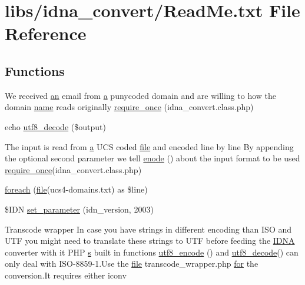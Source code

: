 \hypertarget{ReadMe_8txt}{}\section{libs/idna\+\_\+convert/\+Read\+Me.txt File Reference}
\label{ReadMe_8txt}
\subsection*{Functions}
\begin{DoxyCompactItemize}
\item 
We received \hyperlink{jquery-1_8x_8min_8js_ada4b4d9ce9b76d68aeaf886e5325561f}{an} email from \hyperlink{jqplot_8barRenderer_8min_8js_a15f14caa0c9de3a415d8eb9d88378fc0}{a} punycoded domain and are willing to how the domain \hyperlink{common_8js_a22c29d2aa8ed6161ce8faa718ef76e68}{name} reads originally \hyperlink{ReadMe_8txt_a0edf7f7cb39cbd14fd21a81cd78538f2}{require\+\_\+once} (\textquotesingle{}idna\+\_\+convert.\+class.\+php\textquotesingle{})
\item 
echo \hyperlink{ReadMe_8txt_ac2e4651b745884c7e260ebbc00410561}{utf8\+\_\+decode} (\$output)
\item 
The input is read from \hyperlink{jqplot_8barRenderer_8min_8js_a15f14caa0c9de3a415d8eb9d88378fc0}{a} U\+CS coded \hyperlink{classfile}{file} and encoded line by line By appending the optional second parameter we tell \hyperlink{ReadMe_8txt_a6d3546de17713c76ce7644b01169b126}{enode} () about the input format to be used \hyperlink{ReadMe_8txt_a81b31ad37fad0079bd14d86a4889ffa0}{require\+\_\+once}(\textquotesingle{}idna\+\_\+convert.\+class.\+php\textquotesingle{})
\item 
\hyperlink{ReadMe_8txt_a78ed9bdcd90fd96af66d03ef8b32649c}{foreach} (\hyperlink{classfile}{file}(\textquotesingle{}ucs4-\/domains.\+txt\textquotesingle{}) as \$line)
\item 
\$I\+DN \hyperlink{ReadMe_8txt_ab681c8341064810da2acdba2f3463a37}{set\+\_\+parameter} (\textquotesingle{}idn\+\_\+version\textquotesingle{}, 2003)
\item 
Transcode wrapper In case you have strings in different encoding than I\+SO and U\+TF you might need to translate these strings to U\+TF before feeding the \hyperlink{ReadMe_8txt_a5d4f4ee07624e2d22494ccae4cc77d48}{I\+D\+NA} converter with it P\+HP \hyperlink{respond_8min_8js_ad9a7d92cb87932d25187fdec3ba1b621}{s} built in functions \hyperlink{ReadMe_8txt_ad2cb466e866a85c1ddff5eb4320f0ef1}{utf8\+\_\+encode} () and \hyperlink{ReadMe_8txt_ac2e4651b745884c7e260ebbc00410561}{utf8\+\_\+decode}() can only deal with I\+SO-\/8859-\/1.Use the \hyperlink{classfile}{file} transcode\+\_\+wrapper.\+php \hyperlink{document__category_8js_aa303d4e538a4022d72a50a7ad8ee9799}{for} the conversion.\+It requires either iconv

\end{DoxyCompactItemize}
